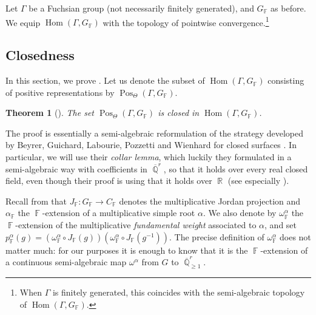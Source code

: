 \documentclass{amsart}
\theoremstyle{plain}
\newtheorem{theorem}[proposition]{Theorem}
\theoremstyle{definition}
\DeclareMathOperator{\Hom}{Hom}
\DeclareMathOperator{\Pos}{Pos}
\DeclareMathOperator{\Fb}{{\mathbb{F}}}
\DeclareMathOperator{\Rb}{{\mathbb{R}}}
\DeclareMathOperator{\Qb}{\mathbb{Q}}
\newcommand{\Qbar}{\overline{\Qb}^r}
\newcommand{\1}{\mathbf{1}}
\begin{document}
Let $\Gamma$ be a Fuchsian group (not necessarily finitely generated), and $G_{\Fb}$ as before.
We equip $\Hom(\Gamma,G_{\Fb})$ with the topology of pointwise convergence.\footnote{When $\Gamma$ is finitely generated, this coincides with the semi-algebraic topology of $\Hom(\Gamma,G_{\Fb})$.}

\subsection{Closedness}
\label{s: Closedness}

 In this section, we prove . Let us denote the subset of $\Hom(\Gamma, G_{\Fb})$ consisting of positive representations by $\Pos_\Theta(\Gamma, G_{\Fb})$.
 
\begin{theorem}[]
\label{thm: closedness}
    The set $\Pos_\Theta(\Gamma,G_{\Fb})$ is closed in $\Hom(\Gamma,G_{\Fb} )$.
\end{theorem}

The proof is essentially a semi-algebraic reformulation of the strategy developed by Beyrer, Guichard, Labourie, Pozzetti and Wienhard for closed surfaces \cite{beyrer2021positive, GLW, BeyrerGuichardLabouriePozzettiWienhard_PositivityCrossRatiosCollarLemma}. In particular, we will use their \emph{collar lemma}, which luckily they formulated in a semi-algebraic way with coefficients in $\Qbar$, so that it holds over every real closed field, even though their proof is using that it holds over $\Rb$ (see especially \cite[Appendix A]{BeyrerGuichardLabouriePozzettiWienhard_PositivityCrossRatiosCollarLemma}).

Recall from  that $J_{\Fb}\colon G_{\Fb} \to C_{\Fb}$ denotes the multiplicative Jordan projection and $\alpha_{\Fb}$ the $\Fb$-extension of a multiplicative simple root $\alpha$. We also denote by $\omega_{\Fb}^\alpha$ the $\Fb$-extension of the multiplicative \emph{fundamental weight} associated to $\alpha$, and set $p^\alpha_{\Fb}(g) = (\omega^\alpha_{\Fb} \circ J_{\Fb}(g))(\omega^\alpha_{\Fb} \circ J_{\Fb}(g^{-1}))$. The precise definition of $\omega_{\Fb}^\alpha$ does not matter much: for our purposes it is enough to know that it is the $\Fb$-extension of a continuous semi-algebraic map $\omega^\alpha$ from $G$ to $\Qbar_{\geq 1}$.
\end{document}
